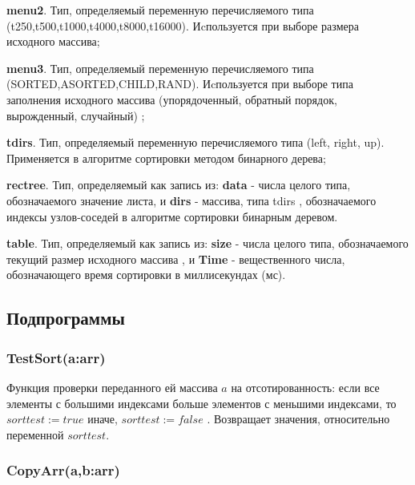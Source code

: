 \documentclass[a4paper,11pt]{article}
\begin{document}
\linebreak 
{\bf menu2}.  Тип, определяемый переменную перечисляемого типа (t250,t500,t1000,t4000,t8000,t16000). Иcпользуется
при выборе размера исходного массива;

\linebreak
{\bf menu3}.  Тип, определяемый переменную перечисляемого типа (SORTED,ASORTED,CHILD,RAND). Иcпользуется
при выборе типа заполнения исходного массива (упорядоченный, обратный порядок, вырожденный, случайный) ;

\linebreak 
{\bf tdirs}. Тип, определяемый переменную перечисляемого типа (left, right, up). 
Применяется в алгоритме сортировки методом бинарного дерева;

\linebreak 
{\bf rectree}. Тип, определяемый как запись из: {\bf data} - числа целого типа, обозначаемого значение листа, и {\bf dirs} - массива, типа tdirs , обозначаемого индексы узлов-соседей в алгоритме сортировки бинарным деревом.

\linebreak 
{\bf table}. Тип, определяемый как запись из: {\bf size} - числа целого типа, обозначаемого текущий  размер исходного массива , и {\bf Time} - вещественного числа, обозначающего время сортировки в миллисекундах (мс).
\\

\begin{center}
\subsection{Подпрограммы}
\end{center}
\begin{center}
\subsubsection{TestSort(a:arr)}
\end{center}

Функция проверки переданного ей массива $a$ на отсотированность: если все элементы с большими индексами больше
элементов с меньшими индексами, то $sorttest :=true$ иначе,  $sorttest :=false$ . Возвращает значения, относительно переменной $sorttest$.
\\
\begin{center}
\subsubsection{CopyArr(a,b:arr)}
\end{center}
\end{document}
